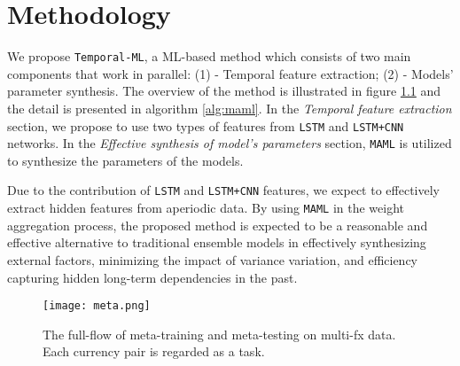 
\chapter{Methodology}
\label{chap:method}


We propose \verb|Temporal-ML|, a ML-based method which consists of two main components that work in parallel: (1) - Temporal feature extraction; (2) - Models' parameter synthesis. The overview of the method is illustrated in figure \ref{fig:flow} and the detail is presented in algorithm \ref{alg:maml}. In the \textit{Temporal feature extraction} section, we propose to use two types of features from \verb|LSTM| and \verb|LSTM+CNN| networks. In the \textit{Effective synthesis of model's parameters} section, \verb|MAML| is utilized to synthesize the parameters of the models.

Due to the contribution of \verb|LSTM| and \verb|LSTM+CNN| features, we expect to effectively extract hidden features from aperiodic data. By using \verb|MAML| in the weight aggregation process, the proposed method is expected to be a reasonable and effective alternative to traditional ensemble models in effectively synthesizing external factors, minimizing the impact of variance variation, and efficiency capturing hidden long-term dependencies in the past.

\begin{figure}[H]
    \centering
    \texttt{[image: meta.png]}
    \caption{The full-flow of meta-training and meta-testing on multi-fx data. Each currency pair is regarded as a task.}
    \label{fig:flow}
\end{figure}

